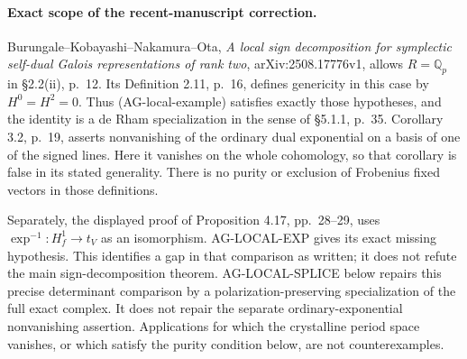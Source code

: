 \paragraph{Exact scope of the recent-manuscript correction.}
Burungale--Kobayashi--Nakamura--Ota,
\emph{A local sign decomposition for symplectic self-dual
Galois representations of rank two}, arXiv:2508.17776v1,
allows $R=\mathbb Q_p$ in \S2.2(ii), p.~12.  Its
Definition 2.11, p.~16, defines genericity in this case
by $H^0=H^2=0$.  Thus (AG-local-example) satisfies exactly
those hypotheses, and the identity is a de Rham specialization
in the sense of \S5.1.1, p.~35.  Corollary 3.2, p.~19,
asserts nonvanishing of the ordinary dual exponential on a
basis of one of the signed lines.  Here it vanishes on the
whole cohomology, so that corollary is false in its stated
generality.  There is no purity or exclusion of Frobenius
fixed vectors in those definitions.

Separately, the displayed proof of Proposition 4.17,
pp.~28--29, uses $\exp^{-1}:H_f^1\to t_V$ as an
isomorphism.  AG-LOCAL-EXP gives its exact missing hypothesis.
This identifies a gap in that comparison as written; it does
not refute the main sign-decomposition theorem.
AG-LOCAL-SPLICE below repairs this precise determinant
comparison by a polarization-preserving specialization of
the full exact complex. It does not repair the separate
ordinary-exponential nonvanishing assertion. Applications for which the
crystalline period space vanishes, or which satisfy the
purity condition below, are not counterexamples.

